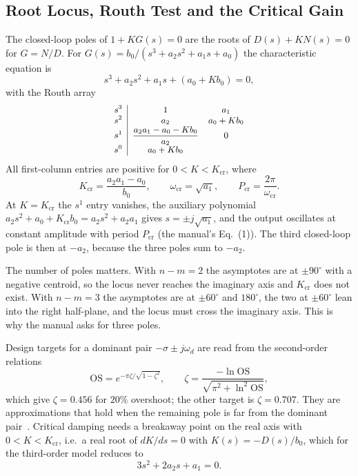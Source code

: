 \documentclass[lettersize,journal]{IEEEtran}
\newcommand{\Kcr}{K_{\mathrm{cr}}}
\newcommand{\wcr}{\omega_{\mathrm{cr}}}
\newcommand{\Pcr}{P_{\mathrm{cr}}}
\begin{document}
\subsection{Root Locus, Routh Test and the Critical Gain}
The closed-loop poles of $1+KG(s)=0$ are the roots of $D(s)+KN(s)=0$ for $G=N/D$. For $G(s)=b_0/(s^3+a_2s^2+a_1s+a_0)$ the characteristic equation is
\begin{equation}
s^3+a_2s^2+a_1s+(a_0+Kb_0)=0,
\label{eq:char}
\end{equation}
with the Routh array
\[
\small
\begin{array}{c|cc}
s^3 & 1 & a_1\\
s^2 & a_2 & a_0+Kb_0\\
s^1 & \dfrac{a_2a_1-a_0-Kb_0}{a_2} & 0\\
s^0 & a_0+Kb_0 &
\end{array}
\]
All first-column entries are positive for $0<K<\Kcr$, where
\begin{equation}
\Kcr=\frac{a_2a_1-a_0}{b_0},\qquad
\wcr=\sqrt{a_1},\qquad
\Pcr=\frac{2\pi}{\wcr}.
\label{eq:kcr}
\end{equation}
At $K=\Kcr$ the $s^1$ entry vanishes, the auxiliary polynomial $a_2s^2+a_0+\Kcr b_0=a_2s^2+a_2a_1$ gives $s=\pm j\sqrt{a_1}$, and the output oscillates at constant amplitude with period $\Pcr$ (the manual's Eq.~(1)). The third closed-loop pole is then at $-a_2$, because the three poles sum to $-a_2$.

The number of poles matters. With $n-m=2$ the asymptotes are at $\pm90^\circ$ with a negative centroid, so the locus never reaches the imaginary axis and $\Kcr$ does not exist. With $n-m=3$ the asymptotes are at $\pm60^\circ$ and $180^\circ$, the two at $\pm60^\circ$ lean into the right half-plane, and the locus must cross the imaginary axis. This is why the manual asks for three poles.

Design targets for a dominant pair $-\sigma\pm j\omega_d$ are read from the second-order relations
\begin{equation}
\mathrm{OS}=e^{-\pi\zeta/\sqrt{1-\zeta^2}},\qquad
\zeta=\frac{-\ln\mathrm{OS}}{\sqrt{\pi^2+\ln^2\mathrm{OS}}},
\label{eq:os}
\end{equation}
which give $\zeta=0.456$ for $20\%$ overshoot; the other target is $\zeta=0.707$. They are approximations that hold when the remaining pole is far from the dominant pair~\cite{ogata}. Critical damping needs a breakaway point on the real axis with $0<K<\Kcr$, i.e.\ a real root of $dK/ds=0$ with $K(s)=-D(s)/b_0$, which for the third-order model reduces to
\begin{equation}
3s^2+2a_2s+a_1=0.
\label{eq:breakaway}
\end{equation}
\end{document}
